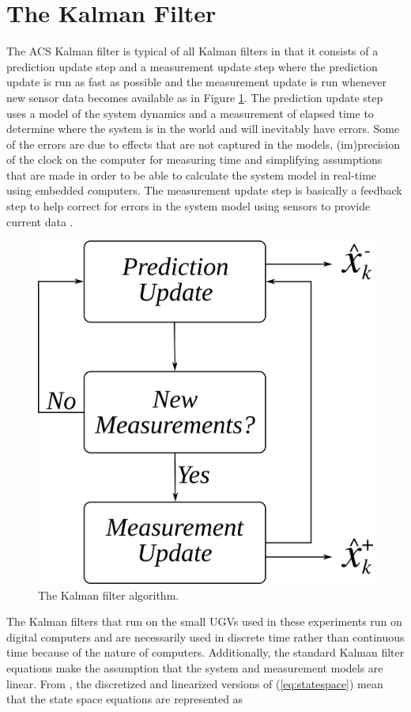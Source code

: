 \section{The Kalman Filter}
\label{sec:kalmanfilter}
The ACS Kalman filter is typical of all Kalman filters in that it consists of a prediction update step and a measurement update step where the prediction update is run as fast as possible and the measurement update is run whenever new sensor data becomes available as in Figure \ref{fig:kf}. The prediction update step uses a model of the system dynamics and a measurement of elapsed time to determine where the system is in the world and will inevitably have errors. Some of the errors are due to effects that are not captured in the models, (im)precision of the clock on the computer for measuring time and simplifying assumptions that are made in order to be able to calculate the system model in real-time using embedded computers. The measurement update step is basically a feedback step to help correct for errors in the system model using sensors to provide current data \cite{Kelly_1994_338}.

\begin{figure}[ht!]
	\centering
	\includegraphics[width=.4\textwidth]{images/kf}
	\caption{The Kalman filter algorithm.}
	\label{fig:kf}
\end{figure}

The Kalman filters that run on the small UGVs used in these experiments run on digital computers and are necessarily used in discrete time rather than continuous time because of the nature of computers. Additionally, the standard Kalman filter equations make the assumption that the system and measurement models are linear. From \cite{Kelly_1994_338}, \cite{Simon06OptimalEstimation} the discretized and linearized versions of (\ref{eq:statespace}) mean that the state space equations are represented as


